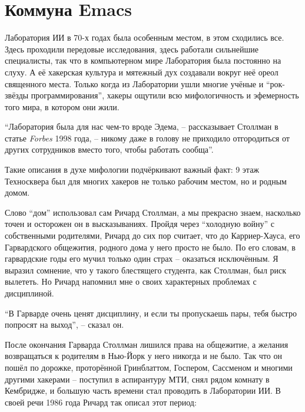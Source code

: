 
\chapter{Коммуна Emacs}

Лаборатория ИИ в 70-х годах была особенным местом, в этом сходились все. Здесь проходили передовые исследования, здесь работали сильнейшие специалисты, так что в компьютерном мире Лаборатория была постоянно на слуху. А её хакерская культура и мятежный дух создавали вокруг неё ореол священного места. Только когда из Лаборатории ушли многие учёные и \enquote{рок-звёзды программирования}, хакеры ощутили всю мифологичность и эфемерность того мира, в котором они жили.

\enquote{Лаборатория была для нас чем-то вроде Эдема, -- рассказывает Столлман в статье \textit{Forbes} 1998 года, -- никому даже в голову не приходило отгородиться от других сотрудников вместо того, чтобы работать сообща}.

Такие описания в духе мифологии подчёркивают важный факт: 9 этаж Техносквера был для многих хакеров не только рабочим местом, но и родным домом.

Слово \enquote{дом} использовал сам Ричард Столлман, а мы прекрасно знаем, насколько точен и осторожен он в высказываниях. Пройдя через \enquote{холодную войну} с собственными родителями, Ричард до сих пор считает, что до Карриер-Хауса, его Гарвардского общежития, родного дома у него просто не было. По его словам, в гарвардские годы его мучил только один страх -- оказаться исключённым. Я выразил сомнение, что у такого блестящего студента, как Столлман, был риск вылететь. Но Ричард напомнил мне о своих характерных проблемах с дисциплиной.

\enquote{В Гарварде очень ценят дисциплину, и если ты пропускаешь пары, тебя быстро попросят на выход}, -- сказал он.

После окончания Гарварда Столлман лишился права на общежитие, а желания возвращаться к родителям в Нью-Йорк у него никогда и не было. Так что он пошёл по дорожке, проторённой Гринблаттом, Госпером, Сассменом и многими другими хакерами -- поступил в аспирантуру МТИ, снял рядом комнату в Кембридже, и большую часть времени стал проводить в Лаборатории ИИ. В своей речи 1986 года Ричард так описал этот период:

